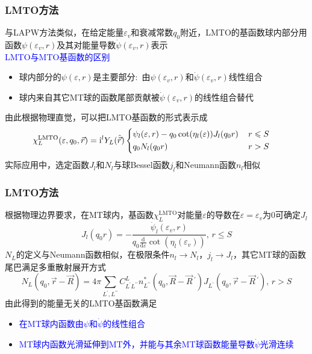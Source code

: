 \documentclass[cjk,slidestop,compress,mathserif,blue]{beamer}
\begin{document}
\frame
{
	\frametitle{\textrm{LMTO}方法}
	与\textrm{LAPW}方法类似，在给定能量$\varepsilon_v$和衰减常数$q_0$附近，\textrm{LMTO}的基函数球内部分用函数$\psi(\varepsilon_v,r)$及其对能量导数$\dot\psi(\varepsilon_v,r)$表示\\
\textcolor{blue}{\textrm{LMTO}与\textrm{MTO}基函数的区别}
	\begin{itemize}
		\item 球内部分的$\psi(\varepsilon,r)$是主要部分:~由$\psi(\varepsilon_v,r)$和$\dot\psi(\varepsilon_v,r)$线性组合
		\item 球内来自其它\textrm{MT}球的函数尾部贡献被$\dot\psi(\varepsilon_v,r)$的线性组合替代
	\end{itemize}
	由此根据物理直觉，可以把\textrm{LMTO}基函数的形式表示成
		\begin{displaymath}
			\hspace*{-12pt}\chi_L^{\mathrm{LMTO}}(\varepsilon,q_0,\vec r)=\mathrm{i}^lY_L(\hat{\vec r})\left\{
			\begin{aligned}
				&\psi_l(\varepsilon,r)-q_0\cot(\eta_l(\varepsilon))J_l(q_0r)&\, r\leqslant S\\
				&q_0N_l(q_0r)&\, r>S
			\end{aligned}\right.
		\end{displaymath}
		实际应用中，选定函数$J_l$和$N_l$与球\textrm{Bessel}函数$j_l$和\textrm{Neumann}函数$n_l$相似
}

\frame
{
	\frametitle{\textrm{LMTO}方法}
	根据物理边界要求，在\textrm{MT}球内，基函数$\chi_L^{\mathrm{LMTO}}$对能量$\varepsilon$的导数在$\varepsilon=\varepsilon_v$为0可确定$J_l$
		\begin{displaymath}
				J_l(q_0r)=-\dfrac{\dot\psi_l(\varepsilon_v,r)}{q_0\frac{\mathrm{d}}{\mathrm{d}\varepsilon}\cot(\eta_l(\varepsilon_v))},\,r\leqslant S
		\end{displaymath}
		$N_L$的定义与\textrm{Neumann}函数相似，在极限条件$n_l\rightarrow N_l$，$j_l\rightarrow J_l$，其它\textrm{MT}球的函数尾巴满足多重散射展开方式
		\begin{displaymath}
				N_L(q_0,\vec r-\vec R)=4\pi\sum_{L^{\prime},L^{\prime\prime}}C_{L^{\prime}L^{\prime\prime}}^Ln_{L^{\prime\prime}}^{\ast}(q_0,\vec R-\vec R\,^{\prime})J_{L^{\prime}}(q_0,\vec r-\vec R\,^{\prime}),\,r>S
		\end{displaymath}
		由此得到的能量无关的\textrm{LMTO}基函数满足
		\begin{itemize}
			\item \textcolor{blue}{在\textrm{MT}球内函数由$\psi$和$\dot\psi$的线性组合}
			\item \textcolor{blue}{\textrm{MT}球内函数光滑延伸到\textrm{MT}外，并能与其余\textrm{MT}球函数能量导数$\dot\psi$光滑连续}
		\end{itemize}
}
\end{document}

